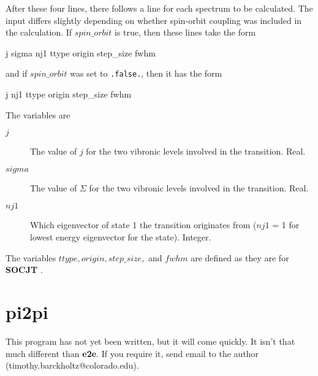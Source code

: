 \documentclass{article}
\newcommand{\socjt}{{\bf SOCJT }}
\newcommand{\etoe}{{\bf e2e}}
\newcommand{\pitopi}{{\bf pi2pi}}
\begin{document}
After these four lines, there follows a line for each spectrum to be
calculated.  The input differs slightly depending on whether
spin-orbit coupling was included in the calculation.  If $spin\_orbit$
is true, then these lines take the form
\begin{verbatim*}
j sigma nj1 ttype origin step_size fwhm
\end{verbatim*}
and if $spin\_orbit$ was set to {\tt .false.}, then it has the form
\begin{verbatim*}
j nj1 ttype origin step_size fwhm
\end{verbatim*}
The variables are
\begin{description}
\item[$j$] The value of $j$ for the two vibronic levels involved in
  the transition. Real.

\item[$sigma$] The value of $\Sigma $ for the two vibronic levels
  involved in the transition. Real.

\item[$nj1$] Which eigenvector of state 1 the transition originates
  from ($nj1$ = 1 for lowest energy eigenvector for the
  state). Integer.

\end{description}
The variables $ttype, origin, step\_size, $ and $fwhm$ are defined as
they are for \socjt .

\section{\pitopi} \label{section:pi2pi}

This program has not yet been written, but it will come quickly. It
isn't that much different than \etoe . If you require it, send email
to the author (timothy.barckholtz@colorado.edu).



\end{document}
